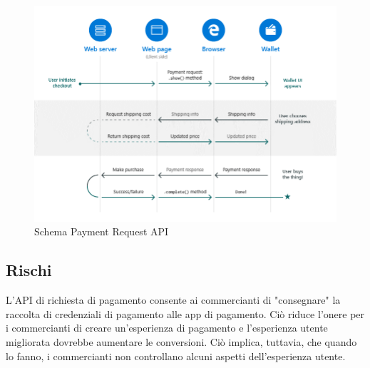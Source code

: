 \documentclass[italian]{article}
\begin{document}
	\begin{figure}
		\centering
		\includegraphics[width=1\linewidth]{SchemaPayment}
		\caption{Schema Payment Request API}
		\label{fig:Schema Payment}
	\end{figure}
	\pagebreak
	\subsection{Rischi}
	L'API di richiesta di pagamento consente ai commercianti di "consegnare" la raccolta di credenziali di pagamento alle app di pagamento. Ciò riduce l'onere per i commercianti di creare un'esperienza di pagamento e l'esperienza utente migliorata dovrebbe aumentare le conversioni. Ciò implica, tuttavia, che quando lo fanno, i commercianti non controllano alcuni aspetti dell'esperienza utente.
	
\end{document}
